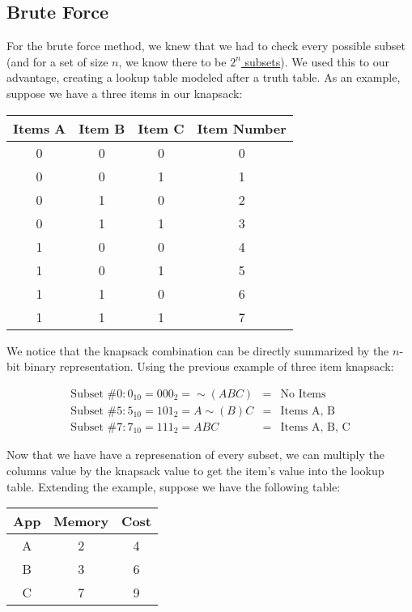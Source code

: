 \documentclass{article}
\begin{document}
\subsection{Brute Force}
For the brute force method, we knew that we had to check every possible subset (and for a set of size $n$, we know there to be \href{http://mathworld.wolfram.com/Subset.html}{$2^n$ subsets}). We used this to our advantage, creating a lookup table modeled after a truth table. As an example, suppose we have a three items in our knapsack:

\begin{center}
    \begin{tabular}{|c|c|c|c|}
        \hline
        Items A & Item B & Item C & Item Number  \\ \hline
        0 & 0 & 0 & 0\\
        0 & 0 & 1 & 1\\
        0 & 1 & 0 & 2\\
        0 & 1 & 1 & 3\\
        1 & 0 & 0 & 4\\
        1 & 0 & 1 & 5\\
        1 & 1 & 0 & 6\\
        1 & 1 & 1 & 7\\
        \hline
    \end{tabular}
\end{center}

We notice that the knapsack combination can be directly summarized by the $n$-bit binary representation. Using the previous example of three item knapsack:

\begin{eqnarray}
    \text{Subset \#0}: 0_{10} = 000_{2} = \sim(ABC) & = & \text{No Items} \\
    \text{Subset \#5}: 5_{10} = 101_{2} = A\sim(B)C & = & \text{Items A, B} \\
    \text{Subset \#7}: 7_{10} = 111_{2} = ABC & = & \text{Items A, B, C}
\end{eqnarray}

Now that we have have a represenation of every subset, we can multiply the columns value by the knapsack value to get the item's value into the lookup table. Extending the example, suppose we have the following table:

\begin{center}
    \begin{tabular}{|c|c|c|}
        \hline
        App & Memory & Cost \\ \hline
        A & 2 & 4 \\
        B & 3 & 6 \\
        C & 7 & 9 \\
        \hline
    \end{tabular}
\end{center}
\end{document}
